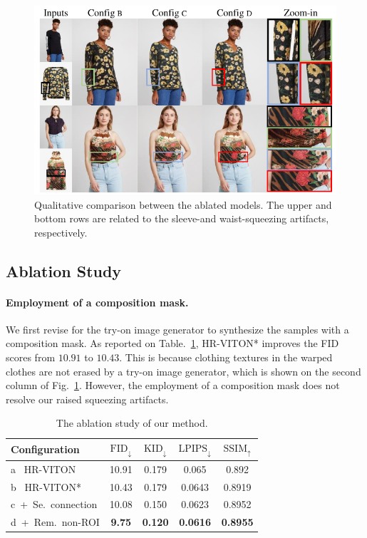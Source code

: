 \documentclass[letterpaper]{article} %
\begin{document}
\begin{figure}[t!]
	\centering
    \includegraphics[width=\linewidth]{fig/fig6.pdf}    
    \caption{Qualitative comparison between the ablated models. The upper and bottom rows are related to the sleeve-and waist-squeezing artifacts, respectively.}
	\label{ablation}
\end{figure}

\subsection{Ablation Study}

\paragraph{Employment of a composition mask.} We first revise for the try-on image generator to synthesize the samples with a composition mask.
As reported on Table.~\ref{tb_ablation_study}, HR-VITON* improves the FID scores from $10.91$ to $10.43$.
This is because clothing textures in the warped clothes are not erased by a try-on image generator, which is shown on the second column of Fig.~\ref{ablation}.
However, the employment of a composition mask does not resolve our raised squeezing artifacts.

\begin{table}[t]
\centering
\begin{tabular}{l|cc|cc}
		\toprule
		Configuration & $\text{FID}_\downarrow$ & $\text{KID}_\downarrow$ & $\text{LPIPS}_\downarrow$ & $\text{SSIM}_\uparrow$  \\
		\midrule 
		\midrule
		{\sc a}~ HR-VITON	& 10.91 & 0.179 & 0.065 & 0.892   \\
        {\sc b}~ HR-VITON*  & 10.43 & 0.179 & 0.0643 & 0.8919 \\
        {\sc c}~+~Se.~connection & 10.08 & 0.150 & 0.0623 & 0.8952 \\
        {\sc d}~+~Rem.~non-ROI & \textbf{9.75} & \textbf{0.120} & \textbf{0.0616} & \textbf{0.8955} \\
		\bottomrule
	\end{tabular}
\caption{The ablation study of our method.} 
\label{tb_ablation_study}
\end{table}
\end{document}
